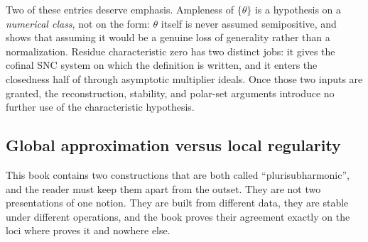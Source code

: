 Two of these entries deserve emphasis.  Ampleness of $\{\theta\}$ is a
hypothesis on a \emph{numerical class}, not on the form: $\theta$ itself
is never assumed semipositive, and  shows that
assuming it would be a genuine loss of generality rather than a
normalization.  Residue characteristic zero has two distinct jobs: it gives
the cofinal SNC system on which the definition is written, and it enters the
closedness half of  through asymptotic
multiplier ideals.  Once those two inputs are granted, the reconstruction,
stability, and polar-set arguments introduce no further use of the
characteristic hypothesis.

\subsection{Global approximation versus local regularity}
\label{sec:ch21-global-vs-local}

This book contains two constructions that are both called
``plurisubharmonic'', and the reader must keep them apart from the outset.
They are not two presentations of one notion.  They are built from
different data, they are stable under different operations, and the book
proves their agreement exactly on the loci where
 proves it and nowhere else.

